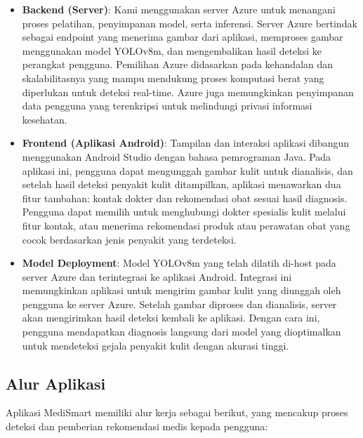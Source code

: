 \documentclass[journal,article,submit,pdftex,moreauthors]{Definitions/mdpi}
\begin{document}
\begin{itemize}
    \item \textbf{Backend (Server)}: Kami menggunakan server Azure untuk menangani proses pelatihan, penyimpanan model, serta inferensi. Server Azure bertindak sebagai endpoint yang menerima gambar dari aplikasi, memproses gambar menggunakan model YOLOv8m, dan mengembalikan hasil deteksi ke perangkat pengguna. Pemilihan Azure didasarkan pada kehandalan dan skalabilitasnya yang mampu mendukung proses komputasi berat yang diperlukan untuk deteksi real-time. Azure juga memungkinkan penyimpanan data pengguna yang terenkripsi untuk melindungi privasi informasi kesehatan.
    
    \item \textbf{Frontend (Aplikasi Android)}: Tampilan dan interaksi aplikasi dibangun menggunakan Android Studio dengan bahasa pemrograman Java. Pada aplikasi ini, pengguna dapat mengunggah gambar kulit untuk dianalisis, dan setelah hasil deteksi penyakit kulit ditampilkan, aplikasi menawarkan dua fitur tambahan: kontak dokter dan rekomendasi obat sesuai hasil diagnosis. Pengguna dapat memilih untuk menghubungi dokter spesialis kulit melalui fitur kontak, atau menerima rekomendasi produk atau perawatan obat yang cocok berdasarkan jenis penyakit yang terdeteksi.
    
    \item \textbf{Model Deployment}: Model YOLOv8m yang telah dilatih di-host pada server Azure dan terintegrasi ke aplikasi Android. Integrasi ini memungkinkan aplikasi untuk mengirim gambar kulit yang diunggah oleh pengguna ke server Azure. Setelah gambar diproses dan dianalisis, server akan mengirimkan hasil deteksi kembali ke aplikasi. Dengan cara ini, pengguna mendapatkan diagnosis langsung dari model yang dioptimalkan untuk mendeteksi gejala penyakit kulit dengan akurasi tinggi.
\end{itemize}

\subsection{Alur Aplikasi}
Aplikasi MediSmart memiliki alur kerja sebagai berikut, yang mencakup proses deteksi dan pemberian rekomendasi medis kepada pengguna:
\end{document}
